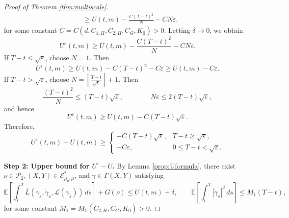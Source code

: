 \documentclass[reqno,11pt]{amsart}
\numberwithin{equation}{section}
\newcommand{\ep}{\varepsilon}
\newcommand{\nd}{\noindent}
\renewcommand{\bar}{\overline}
\begin{document}
\begin{proof}[Proof of Theorem \ref{thm:multiscale}]
\[\begin{aligned}
& \geq U(t,m ) -\frac{C(T-t)^2}{N}-CN\ep.
\end{aligned}
\]
for some constant $C=C(d,C_{1,H},C_{2,H},C_G, K_0)>0$.
Letting $\delta \to 0$, we obtain
\[
U^\ep(t,m) \geq U(t,m) -\frac{C(T-t)^2}{N}-CN\ep.
\]
If $T-t \leq \sqrt{\ep}$, choose $N=1$. Then
\[
U^\ep(t,m) \geq U(t,m) -C(T-t)^2-C\ep \geq U(t,m) -C\ep.
\]
If $T-t > \sqrt{\ep}$, choose $N=\left\lfloor\frac{T-t}{\sqrt{\ep}}\right\rfloor+1$. Then
\[
\frac{(T-t)^2}{N} \leq (T-t)\sqrt{\ep}, \qquad \qquad N \ep \leq 2(T-t) \sqrt{\ep},
\]
and hence
\[
U^\ep(t,m) \geq U(t,m) -C(T-t) \sqrt{\ep}.
\]
Therefore,
\[
U^\ep(t,m)-U(t,m) \ge
\begin{cases}
-C(T-t)\sqrt{\ep}, & T-t \ge \sqrt{\varepsilon},\\[4pt]
-C\ep, & 0\leq T-t<\sqrt{\ep}.
\end{cases}
\]

\nd
\textbf{Step 2: Upper bound for $U^\ep-U$.} By Lemma \ref{prop:Uformula}, there exist $\nu \in \mathcal{P}_2, (X,Y)\in \mathcal{E}^\ast_{\mu_0,\mu}$, and $\gamma\in \Gamma(X,Y)$ satisfying
\begin{equation}\label{eqn:upbdvelbd}
   \mathbb{E}\left[\int^T_{t} \bar{L}\left(\gamma_s, \dot{\gamma}_s, \mathcal{L}(\gamma_s) \right) \, ds\right] +G(\nu) \leq U(t, m)+\delta, \qquad \mathbb{E}\left[ \int_{t}^T\left|\dot{\gamma}_s\right|^2\,
ds\right] \leq M_1(T-t),
\end{equation}
for some constant $M_1=M_1(C_{2, H}, C_G, K_0)>0$.



\end{proof}
\end{document}
